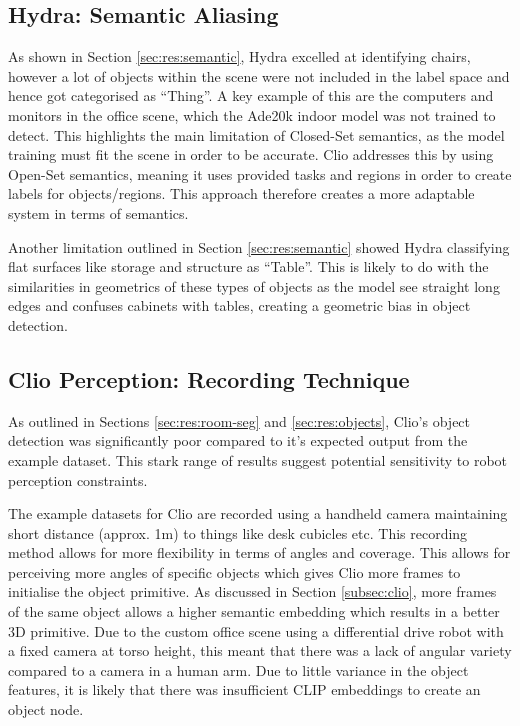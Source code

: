 \subsection{Hydra: Semantic Aliasing}\label{sec:disc-semantics}

As shown in Section \ref{sec:res:semantic}, Hydra excelled at identifying chairs, however a lot of objects within the scene were not included in the label space and hence got categorised as “Thing”. A key example of this are the computers and monitors in the office scene, which the Ade20k indoor model was not trained to detect. This highlights the main limitation of Closed-Set semantics, as the model training must fit the scene in order to be accurate. Clio addresses this by using Open-Set semantics, meaning it uses provided tasks and regions in order to create labels for objects/regions. This approach therefore creates a more adaptable system in terms of semantics.

Another limitation outlined in Section \ref{sec:res:semantic} showed Hydra classifying flat surfaces like storage and structure as “Table”. This is likely to do with the similarities in geometrics of these types of objects as the model see straight long edges and confuses cabinets with tables, creating a geometric bias in object detection.

\subsection{Clio Perception: Recording Technique}\label{sec:disc-clio-rec}

As outlined in Sections \ref{sec:res:room-seg} and \ref{sec:res:objects}, Clio’s object detection was significantly poor compared to it’s expected output from the example dataset. This stark range of results suggest potential sensitivity to robot perception constraints. 

The example datasets for Clio are recorded using a handheld camera maintaining short distance (approx. 1m) to things like desk cubicles etc. This recording method allows for more flexibility in terms of angles and coverage. This allows for perceiving more angles of specific objects which gives Clio more frames to initialise the object primitive. As discussed in Section \ref{subsec:clio}, more frames of the same object allows a higher semantic embedding which results in a better 3D primitive. Due to the custom office scene using a differential drive robot with a fixed camera at torso height, this meant that there was a lack of angular variety compared to a camera in a human arm. Due to little variance in the object features, it is likely that there was insufficient CLIP embeddings to create an object node.

